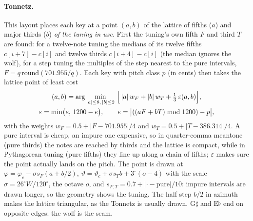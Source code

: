\paragraph{Tonnetz.} This layout places each key at a point $(a,b)$ of the lattice of fifths ($a$) and major thirds
($b$) \emph{of the tuning in use}. First the tuning's own fifth $F$ and third $T$ are found: for a twelve-note tuning
the medians of its twelve fifths $c[i+7]-c[i]$ and twelve thirds $c[i+4]-c[i]$ (the median ignores the wolf),
for a step tuning the multiples of the step nearest to the pure intervals, $F = q\,\mathrm{round}(701.955/q)$. Each
key with pitch class $p$ (in cents) then takes the lattice point of least cost
\begin{gather}
  (a,b) = \arg\min_{|a|\le 8,\,|b|\le 2}\ \Bigl[\,|a|\,w_F + |b|\,w_T + \tfrac13\,\varepsilon(a,b)\Bigr],\\
  \varepsilon = \min\bigl(e,\,1200-e\bigr),\qquad e = \bigl|((aF+bT)\bmod 1200) - p\bigr|,
\end{gather}
with the weights $w_F = 0.5 + |F-701.955|/4$ and $w_T = 0.5+|T-386.314|/4$. A pure interval is cheap, an impure one
expensive, so in quarter-comma meantone (pure thirds) the notes are reached by thirds and the lattice is compact,
while in Pythagorean tuning (pure fifths) they line up along a chain of fifths; $\varepsilon$ makes sure the point
actually lands on the pitch. The point is drawn at
$\varphi = \varphi_c - \sigma s_F(a + b/2)$, $\vartheta = \vartheta_c + \sigma s_T b + 3^\circ(o-4)$ with the scale
$\sigma = 26^\circ W/120^\circ$, the octave $o$, and $s_{F,T} = 0.7 + |{\cdot}-\text{pure}|/10$: impure intervals are
drawn longer, so the geometry shows the tuning. The half step $b/2$ in azimuth makes the lattice triangular, as the
Tonnetz is usually drawn. $\mathrm{G}\sharp$ and $\mathrm{E}\flat$ end on opposite edges: the wolf is the seam.










